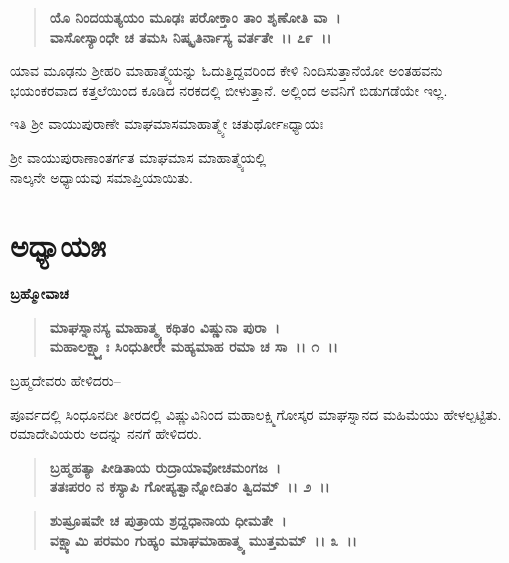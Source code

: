 \begin{verse}
\textbf{ಯೊ ನಿಂದಯತ್ಯಯಂ ಮೂಢಃ ಪರೋಕ್ತಾಂ ತಾಂ ಶೃಣೋತಿ ವಾ~।}\\\textbf{ವಾಸೋಸ್ಯಾಂಧೇ ಚ ತಮಸಿ ನಿಷ್ಕೃತಿರ್ನಾಸ್ಯ ವರ್ತತೇ~।। ೭೯~।।}
\end{verse}

ಯಾವ ಮೂಢನು ಶ‍್ರೀಹರಿ ಮಾಹಾತ್ಮ್ಯೆಯನ್ನು ಓದುತ್ತಿದ್ದವರಿಂದ ಕೇಳಿ ನಿಂದಿಸುತ್ತಾನೆಯೋ ಅಂತಹವನು ಭಯಂಕರವಾದ ಕತ್ತಲೆಯಿಂದ ಕೂಡಿದ ನರಕದಲ್ಲಿ ಬೀಳುತ್ತಾನೆ. ಅಲ್ಲಿಂದ ಅವನಿಗೆ ಬಿಡುಗಡೆಯೇ ಇಲ್ಲ.

\begin{center}
ಇತಿ ಶ‍್ರೀ ವಾಯುಪುರಾಣೇ ಮಾಘಮಾಸಮಾಹಾತ್ಮ್ಯೇ ಚತುರ್ಥೋsಧ್ಯಾಯಃ
\end{center}

\begin{center}
 ಶ‍್ರೀ ವಾಯುಪುರಾಣಾಂತರ್ಗತ ಮಾಘಮಾಸ ಮಾಹಾತ್ಮ್ಯೆಯಲ್ಲಿ \\ ನಾಲ್ಕನೇ ಅಧ್ಯಾಯವು ಸಮಾಪ್ತಿಯಾಯಿತು.
\end{center}

\newpage

\section*{ಅಧ್ಯಾಯ೫}

\emptypage

\begin{flushleft}
\textbf{ಬ್ರಹ್ಮೋವಾಚ}
\end{flushleft}

\begin{verse}
\textbf{ಮಾಘಸ್ನಾನಸ್ಯ ಮಾಹಾತ್ಮ್ಯ ಕಥಿತಂ ವಿಷ್ಣುನಾ ಪುರಾ~। }\\\textbf{ಮಹಾಲಕ್ಷ್ಮ್ಯಾಃ ಸಿಂಧುತೀರೇ ಮಹ್ಯಮಾಹ ರಮಾ ಚ ಸಾ~।। ೧~।।}
\end{verse}

\begin{flushleft}
ಬ್ರಹ್ಮದೇವರು ಹೇಳಿದರು–
\end{flushleft}

ಪೂರ್ವದಲ್ಲಿ ಸಿಂಧೂನದೀ ತೀರದಲ್ಲಿ ವಿಷ್ಣುವಿನಿಂದ ಮಹಾಲಕ್ಷ್ಮಿಗೋಸ್ಕರ ಮಾಘಸ್ನಾನದ ಮಹಿಮೆಯು ಹೇಳಲ್ಪಟ್ಟಿತು. ರಮಾದೇವಿಯರು ಅದನ್ನು ನನಗೆ ಹೇಳಿದರು.

\begin{verse}
\textbf{ಬ್ರಹ್ಮಹತ್ಯಾ ಪೀಡಿತಾಯ ರುದ್ರಾಯಾವೋಚಮಂಗಜ~।}\\\textbf{ತತಃಪರಂ ನ ಕಸ್ಯಾಪಿ ಗೋಪ್ಯತ್ವಾನ್ನೋದಿತಂ ತ್ವಿದಮ್~।। ೨~।।} 
\end{verse}

\begin{verse}
\textbf{ಶುಷ್ರೂಷವೇ ಚ ಪುತ್ರಾಯ ಶ್ರದ್ದಧಾನಾಯ ಧೀಮತೇ~।}\\\textbf{ವಕ್ಷ್ಯಾಮಿ ಪರಮಂ ಗುಹ್ಯಂ ಮಾಘಮಾಹಾತ್ಮ್ಯ ಮುತ್ತಮಮ್~।। ೩~।।}
\end{verse}

